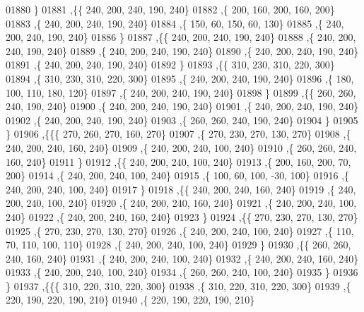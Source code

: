 \begin{DoxyCode}
01880     \}
01881    ,\{\{   240,   200,   240,   190,   240\}
01882     ,\{   200,   160,   200,   160,   200\}
01883     ,\{   240,   200,   240,   190,   240\}
01884     ,\{   150,    60,   150,    60,   130\}
01885     ,\{   240,   200,   240,   190,   240\}
01886     \}
01887    ,\{\{   240,   200,   240,   190,   240\}
01888     ,\{   240,   200,   240,   190,   240\}
01889     ,\{   240,   200,   240,   190,   240\}
01890     ,\{   240,   200,   240,   190,   240\}
01891     ,\{   240,   200,   240,   190,   240\}
01892     \}
01893    ,\{\{   310,   230,   310,   220,   300\}
01894     ,\{   310,   230,   310,   220,   300\}
01895     ,\{   240,   200,   240,   190,   240\}
01896     ,\{   180,   100,   110,   180,   120\}
01897     ,\{   240,   200,   240,   190,   240\}
01898     \}
01899    ,\{\{   260,   260,   240,   190,   240\}
01900     ,\{   240,   200,   240,   190,   240\}
01901     ,\{   240,   200,   240,   190,   240\}
01902     ,\{   240,   200,   240,   190,   240\}
01903     ,\{   260,   260,   240,   190,   240\}
01904     \}
01905    \}
01906   ,\{\{\{   270,   260,   270,   160,   270\}
01907     ,\{   270,   230,   270,   130,   270\}
01908     ,\{   240,   200,   240,   160,   240\}
01909     ,\{   240,   200,   240,   100,   240\}
01910     ,\{   260,   260,   240,   160,   240\}
01911     \}
01912    ,\{\{   240,   200,   240,   100,   240\}
01913     ,\{   200,   160,   200,    70,   200\}
01914     ,\{   240,   200,   240,   100,   240\}
01915     ,\{   100,    60,   100,   -30,   100\}
01916     ,\{   240,   200,   240,   100,   240\}
01917     \}
01918    ,\{\{   240,   200,   240,   160,   240\}
01919     ,\{   240,   200,   240,   100,   240\}
01920     ,\{   240,   200,   240,   160,   240\}
01921     ,\{   240,   200,   240,   100,   240\}
01922     ,\{   240,   200,   240,   160,   240\}
01923     \}
01924    ,\{\{   270,   230,   270,   130,   270\}
01925     ,\{   270,   230,   270,   130,   270\}
01926     ,\{   240,   200,   240,   100,   240\}
01927     ,\{   110,    70,   110,   100,   110\}
01928     ,\{   240,   200,   240,   100,   240\}
01929     \}
01930    ,\{\{   260,   260,   240,   160,   240\}
01931     ,\{   240,   200,   240,   100,   240\}
01932     ,\{   240,   200,   240,   160,   240\}
01933     ,\{   240,   200,   240,   100,   240\}
01934     ,\{   260,   260,   240,   100,   240\}
01935     \}
01936    \}
01937   ,\{\{\{   310,   220,   310,   220,   300\}
01938     ,\{   310,   220,   310,   220,   300\}
01939     ,\{   220,   190,   220,   190,   210\}
01940     ,\{   220,   190,   220,   190,   210\}

\end{DoxyCode}
